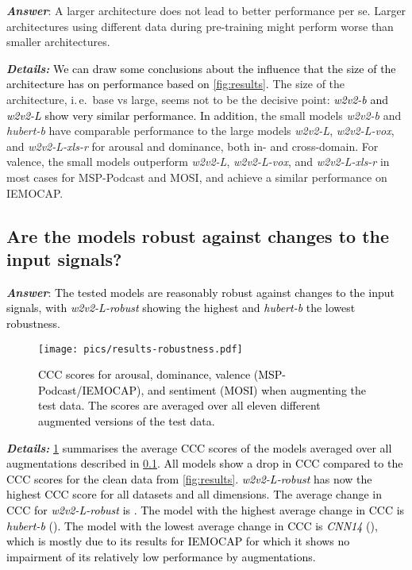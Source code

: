 \documentclass{article}
\newcommand\cnn{\mbox{\emph{CNN14}}}
\newcommand\wbase{\mbox{\emph{w2v2-b}}}
\newcommand\hbase{\mbox{\emph{hubert-b}}}
\newcommand\wlarge{\mbox{\emph{w2v2-L}}}
\newcommand\wrobust{\mbox{\emph{w2v2-L-robust}}}
\newcommand\wvox{\mbox{\emph{w2v2-L-vox}}}
\newcommand\wxlsr{\mbox{\emph{w2v2-L-xls-r}}}
\newcommand{\review}[1]{\textcolor{black}{#1}}
\newcommand\msppodcast{\mbox{MSP-Podcast}}
\newcommand\iemocap{\mbox{IEMOCAP}}
\newcommand\mosi{\mbox{MOSI}}
\newcommand{\ie}{i.\,e.\ }
\begin{document}
\emph{\textbf{Answer}}:
A larger architecture does not lead to better performance per se.
Larger architectures using different data during pre-training might perform worse than smaller architectures. 

\noindent
\emph{\textbf{Details:}}
\review{We can draw some conclusions 
about the influence 
that the size of the architecture
has on performance
based on \cref{fig:results}.}
The size of the architecture, \ie base vs large,
seems not to be the decisive point: 
\review{{\wbase} and {\wlarge} show very similar performance.}
\review{In addition,}
the small models {\wbase} and {\hbase} 
have comparable performance 
to the large models {\wlarge}, {\wvox}, and {\wxlsr} 
for arousal and dominance,
both in- and cross-domain. 
For valence, the small models outperform {\wlarge}, {\wvox}, and {\wxlsr}
in most cases for {\msppodcast} and {\mosi},
and achieve a similar performance on {\iemocap}.




\subsection{Are the models robust against changes to the input signals?}
\label{subsec:robustness}

\emph{\textbf{Answer}}:
\review{
The tested models are reasonably robust against changes to the input signals,
with {\wrobust} showing the highest and {\hbase} the lowest robustness.
}

\begin{figure}[t]
    \centering
    \texttt{[image: pics/results-robustness.pdf]}
    \caption{
        \review{
        \ac{CCC} scores for arousal, dominance,
        valence ({\msppodcast}/{\iemocap}), and sentiment ({\mosi})
        when augmenting the test data.
        The scores are averaged over all eleven different
        augmented versions of the test data.
        }
    }
    \label{fig:robustness}
\end{figure}

\noindent
\emph{\textbf{Details:}}
\review{
\cref{fig:robustness} summarises the average \ac{CCC} scores of the models
averaged over all augmentations described in \cref{subsec:robustness}.
All models show a drop in \ac{CCC}
compared to the \ac{CCC} scores for the clean data
from \cref{fig:results}.
{\wrobust} has now the highest \ac{CCC} score
for all datasets and all dimensions.
The average change in \ac{CCC} for {\wrobust} is .
The model with the highest average change in \ac{CCC}
is {\hbase} ().
The model with the lowest average change in \ac{CCC}
is {\cnn} (),
which is mostly due to its results for {\iemocap}
for which it shows no impairment
of its relatively low performance
by augmentations.
}
\end{document}
